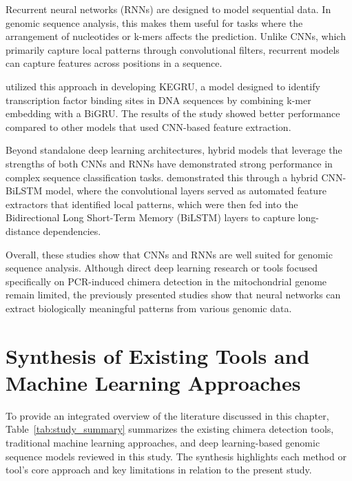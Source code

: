 Recurrent neural networks (RNNs) are designed to model sequential data. In genomic sequence analysis, this makes them useful for tasks where the arrangement of nucleotides or k-mers affects the prediction. Unlike CNNs, which primarily capture local patterns through convolutional filters, recurrent models can capture features across positions in a sequence.

\citet{Shen2018} utilized this approach in developing KEGRU, a model designed to identify transcription factor binding sites in DNA sequences by combining k-mer embedding with a BiGRU. The results of the study showed better performance compared to other models that used CNN-based feature extraction.

Beyond standalone deep learning architectures, hybrid models that leverage the strengths of both CNNs and RNNs have demonstrated strong performance in complex sequence classification tasks. \citet{Tabane2025} demonstrated this through a hybrid CNN-BiLSTM model, where the convolutional layers served as automated feature extractors that identified local patterns, which were then fed into the Bidirectional Long Short-Term Memory (BiLSTM) layers to capture long-distance dependencies.

Overall, these studies show that CNNs and RNNs are well suited for genomic sequence analysis. Although direct deep learning research or tools focused specifically on PCR-induced chimera detection in the mitochondrial genome remain limited, the previously presented studies show that neural networks can extract biologically meaningful patterns from various genomic data.

\section{Synthesis of Existing Tools and Machine Learning Approaches}

To provide an integrated overview of the literature discussed in this chapter, Table~\ref{tab:study_summary} summarizes the existing chimera detection tools, traditional machine learning approaches, and deep learning-based genomic sequence models reviewed in this study. The synthesis highlights each method or tool’s core approach and key limitations in relation to the present study.

